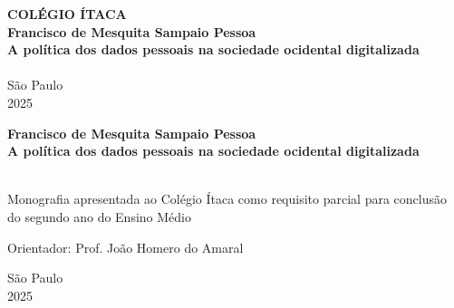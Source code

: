 
\newcommand{\instituicao}{Colégio Ítaca}
\newcommand{\autor}{Francisco de Mesquita Sampaio Pessoa}
\newcommand{\local}{São Paulo}
\newcommand{\dataentrega}{2025}
\newcommand{\orientador}{Prof. João Homero do Amaral}
\newcommand{\tipo}{Monografia apresentada ao \instituicao{} como requisito parcial para conclusão do segundo ano do Ensino Médio}
\newcommand{\titulo}{A política dos dados pessoais na sociedade ocidental digitalizada}
\newcommand{\subtitulo}{}

\onehalfspacing %

\begin{titlepage}
    \begin{center}
        \textbf{\MakeUppercase{\instituicao}}\\[2cm]
        \textbf{\autor}\\[5cm]
        \textbf{\titulo}\\
        \ifx\subtitulo\empty\else \textbf{\subtitulo}\\[5cm] \fi
        \vfill
        \local\\
        \dataentrega
    \end{center}
\end{titlepage}

\begin{titlepage}
    \begin{center}
        \textbf{\autor}\\[5cm]
        \textbf{\titulo}\\
        \ifx\subtitulo\empty\else \textbf{\subtitulo}\\[3cm] \fi
    \end{center}

    \vfill
    \begin{flushright}
        \begin{minipage}{8.2cm}
            \small
            \tipo

            Orientador: \orientador
        \end{minipage}
    \end{flushright}

    \vfill
    \begin{center}
        \local\\
        \dataentrega
    \end{center}
\end{titlepage}

